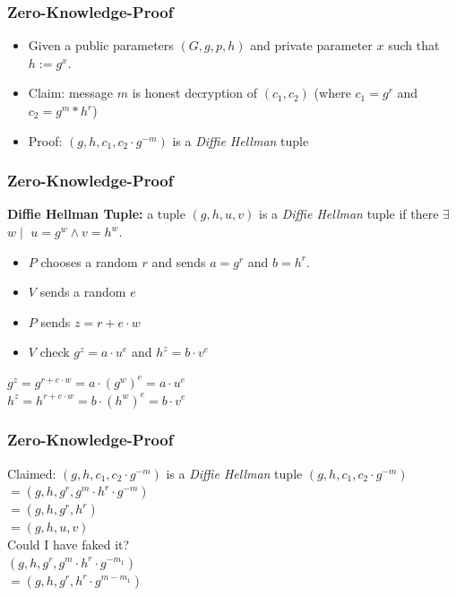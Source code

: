 \documentclass{beamer}
\begin{document}
\begin{frame}
\frametitle{Zero-Knowledge-Proof}
\begin{itemize}
\item Given a public parameters $(G, g, p, h)$ and private parameter $x$ such that $h := g^x$.
\item Claim: message $m$  is honest decryption of $(c_{1}, c_{2})$ (where $c_{1} = g^r$ and $c_{2} = g^{m} * h^{r}$)
\item Proof: $(g, h, c_{1}, c_{2} \cdot g^{-m})$ is a \textit{Diffie Hellman} tuple 
\end{itemize}
\end{frame}


\begin{frame}
\frametitle{Zero-Knowledge-Proof}
\textbf{Diffie Hellman Tuple:} a tuple $(g, h, u, v)$ is 
 a \textit{Diffie Hellman} tuple if there $\exists$ $w \mid$
 $u = g^w \land v = h^w$. 
 
 \begin{itemize}
 \item $P$ chooses a random $r$ and sends $a=g^r$ and $b = h^r$.
 \item $V$ sends a random $e$
 \item $P$ sends $z =r + e \cdot w$
 \item $V$ check $g^z = a \cdot u^e$ and $h^z = b\cdot v^e$ 
 \end{itemize}
 $g^z = g^{r + e \cdot w} = a \cdot (g^w)^e = a \cdot u^e $\\
 $h^z = h^{r + e \cdot w} = b \cdot (h^w)^e = b \cdot v^e$
\end{frame}

\begin{frame}
\frametitle{Zero-Knowledge-Proof}
{Claimed: $(g, h, c_{1}, c_{2} \cdot g^{-m})$ is a \textit{Diffie Hellman} tuple}
$(g, h, c_{1}, c_{2} \cdot g^{-m})$\\
$ = (g, h, g^r, g^m \cdot h^r \cdot g^{-m})$ \\
$ = (g, h, g^r, h^r)$ \\
$ = (g, h, u, v)$\\ 
{Could I have faked it?} \\
$(g, h, g^r, g^m \cdot h^r \cdot g^{-m_{1}})$ \\
$ = (g, h, g^r, h^r \cdot g^{m - m_{1}})$

\end{frame}
\end{document}
